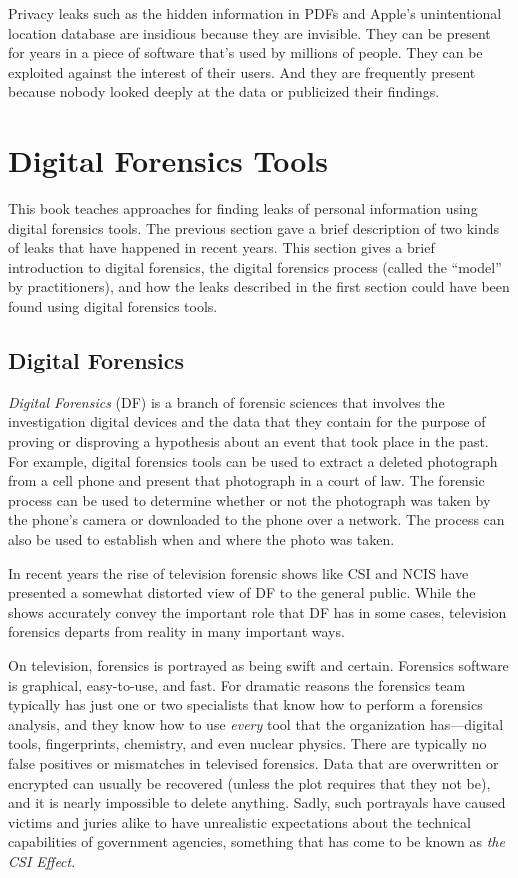 Privacy leaks such as the hidden information in PDFs and Apple's
unintentional location database are insidious because they are
invisible. They can be present for years in a piece of software that's
used by millions of people. They can be exploited against the interest
of their users. And they are frequently present because nobody looked
deeply at the data or publicized their findings. 

\section{Digital Forensics Tools}

This book teaches approaches for finding leaks of personal information using
digital forensics tools. The previous section gave a brief description
of two kinds of leaks that have happened in recent years. This
section gives a brief introduction to digital forensics, the digital
forensics process (called the ``model'' by practitioners), and how the
leaks described in the first section could have been found using
digital forensics tools.

\subsection{Digital Forensics}

\emph{Digital Forensics} (DF) is a branch of forensic sciences that
involves the investigation digital devices and the data that they
contain for the purpose of proving or disproving a hypothesis about an
event that took place in the past. For example, digital forensics
tools can be used to extract a deleted photograph from a cell phone
and present that photograph in a court of law. The forensic process
can be used to determine whether or not the photograph was taken by the
phone's camera or downloaded to the phone over a network. The process
can also be used to establish when and where the photo was taken.

In recent years the rise of television forensic shows like CSI and
NCIS have presented a somewhat distorted view of DF to
the general public. While the shows accurately convey the important
role that DF has in some cases, television forensics departs from
reality in many important ways. 

On television, forensics is portrayed as being swift and
certain. Forensics software is graphical, easy-to-use, and fast. For
dramatic reasons the forensics team typically has just one or two
specialists that know how to perform a forensics analysis, and they know how
to use \emph{every} tool that the organization has---digital tools,
fingerprints, chemistry, and even nuclear physics. There are typically
no false positives or mismatches in televised forensics. Data that are
overwritten or encrypted can usually be recovered (unless the plot
requires that they not be), and it is nearly impossible to delete
anything. Sadly, such portrayals have caused victims and  juries alike
to have unrealistic expectations about the technical capabilities of
government agencies, something that has come to be known as \emph{the
  CSI Effect}\cite{csi-effect}\cite{beyond-csi-effect}.

